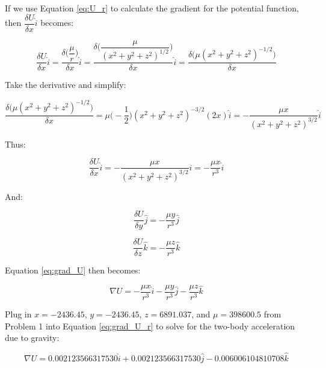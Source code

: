 \documentclass[conf]{new-aiaa}
\begin{document}
If we use Equation \ref{eq:U_r} to calculate the gradient for the potential function, then $\dfrac{\delta U}{\delta x} \hat{i}$ becomes: 

\begin{equation}
\frac{\delta U}{\delta x} \hat{i} = 
\dfrac{\delta \Big( \dfrac{\mu}{r} \Big) }{\delta x} \hat{i} = 
\dfrac{ \delta \Big( \dfrac{\mu}{ ( x^2 + y^2 + z^2 )^{1/2} } \Big) }{\delta x} \hat{i} = 
\dfrac{\delta \big( \mu ( x^2 + y^2 + z^2 )^{-1/2} \big) }{ \delta x }
\end{equation}

Take the derivative and simplify: 

\begin{equation}
\dfrac{\delta \big( \mu ( x^2 + y^2 + z^2 )^{-1/2} \big) }{ \delta x } = 
 \mu \Big( -\frac{1}{2} \Big) ( x^2 + y^2 + z^2 )^{-3/2} ( 2x ) \hat{i} = 
 - \dfrac{\mu x}{ ( x^2 + y^2 + z^2 )^{3/2} } \hat{i}
\end{equation}

Thus: 

\begin{equation}
\frac{\delta U}{\delta x} \hat{i} = - \dfrac{\mu x}{ ( x^2 + y^2 + z^2 )^{3/2} } \hat{i} = - \dfrac{\mu x}{r^3} \hat{i}
\end{equation}

And: 

\begin{equation}
\frac{\delta U}{\delta y} \hat{j} = - \dfrac{\mu y}{r^3} \hat{j}
\end{equation}

\begin{equation}
\frac{\delta U}{\delta z} \hat{k} = - \dfrac{\mu z}{r^3} \hat{k}
\end{equation}

Equation \ref{eq:grad_U} then becomes: 

\begin{equation}
\nabla U = - \dfrac{\mu x}{r^3} \hat{i} - \dfrac{\mu y}{r^3} \hat{j} - \dfrac{\mu z}{r^3} \hat{k}
\label{eq:grad_U_r}
\end{equation}

Plug in $x = -2436.45$, $y = -2436.45$, $z = 6891.037$, and $\mu = 398600.5$ from Problem 1 into Equation \ref{eq:grad_U_r} to solve for the two-body acceleration due to gravity: 

\begin{equation}
\nabla U = 0.002123566317530 \hat{i} + 0.002123566317530 \hat{j} - 0.006006104810708 \hat{k}
\end{equation}
\end{document}
